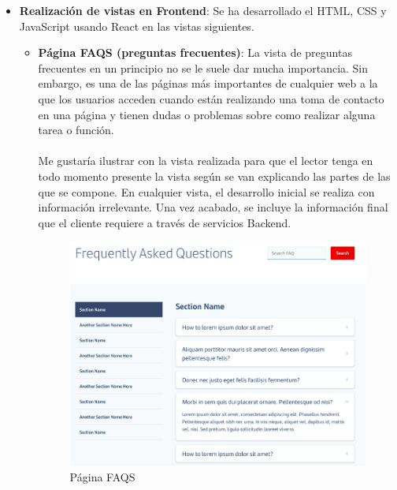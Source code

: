\documentclass[a4paper,12pt]{article}
\begin{document}
\begin{itemize}
    \item \textbf{Realización de vistas en Frontend}: Se ha desarrollado el HTML, CSS y JavaScript usando React en las vistas siguientes.
    \begin{itemize}
        \item \textbf{Página FAQS (preguntas frecuentes)}: La vista de preguntas frecuentes en un principio no se le suele dar mucha importancia. Sin embargo, es una de las páginas más importantes de cualquier web a la que los usuarios acceden cuando están realizando una toma de contacto en una página y tienen dudas o problemas sobre como realizar alguna tarea o función.\\
        \\
        Me gustaría ilustrar con la vista realizada para que el lector tenga en todo momento presente la vista según se van explicando las partes de las que se compone. En cualquier vista, el desarrollo inicial se realiza con información irrelevante. Una vez acabado, se incluye la información final que el cliente requiere a través de servicios Backend.
        \begin{figure}[H]
            \centering
            \includegraphics[scale=0.9]{faq.PNG}
            \caption{Página FAQS}
            \label{fig:my_label}
        \end{figure}
        

\end{itemize}
\end{itemize}
\end{document}
